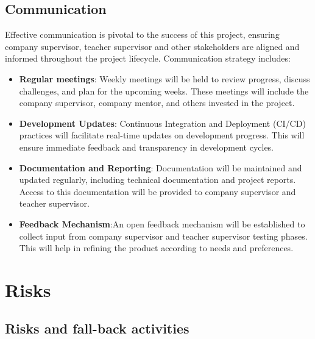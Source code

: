 \documentclass[a4paper, 11pt]{article}
\begin{document}
  \subsection{Communication} 
  Effective communication is pivotal to the success of this project, ensuring company supervisor, teacher supervisor and other stakeholders are aligned and informed throughout the project lifecycle. Communication strategy includes:
  \begin{itemize}
    \item \textbf{Regular meetings}: Weekly meetings will be held to review progress, discuss challenges, and plan for the upcoming weeks. These meetings will include the company supervisor, company mentor, and others invested in the project.
    \item\textbf{Development Updates}: Continuous Integration and Deployment (CI/CD) practices will facilitate real-time updates on development progress. This will ensure immediate feedback and transparency in development cycles.
    \item \textbf{Documentation and Reporting}: Documentation will be maintained and updated regularly, including technical documentation and project reports. Access to this documentation will be provided to company supervisor and teacher supervisor.
    \item  \textbf{Feedback Mechanism}:An open feedback mechanism will be established to collect input from company supervisor and teacher supervisor testing phases. This will help in refining the product according to needs and preferences.
  \end{itemize}



\section{Risks}
\subsection{Risks and fall-back activities}
\end{document}
